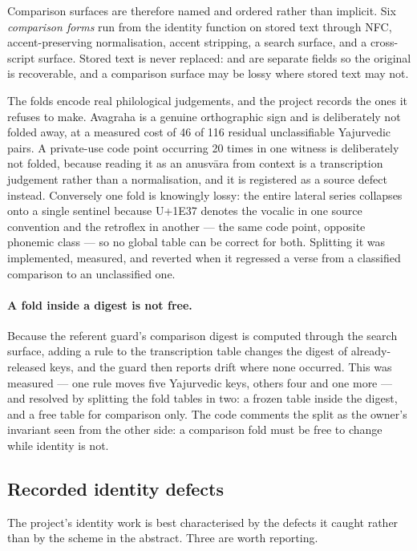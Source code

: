 Comparison surfaces are therefore named and ordered rather than implicit. Six
\emph{comparison forms} run from the identity function on stored text through
\mbox{NFC}, accent-preserving normalisation, accent stripping, a search surface, and a
cross-script surface. Stored text is never replaced:  and
 are separate fields so the original is recoverable, and a comparison
surface may be lossy where stored text may not.

The folds encode real philological judgements, and the project records the ones it
refuses to make. Avagraha is a genuine orthographic sign and is deliberately not
folded away, at a measured cost of 46 of 116 residual unclassifiable Yajurvedic pairs.
A private-use code point occurring 20 times in one witness is deliberately not folded,
because reading it as an anusv\=ara from context is a transcription judgement rather
than a normalisation, and it is registered as a source defect instead. Conversely one
fold is knowingly lossy: the entire lateral series collapses onto a single sentinel
because U+1E37 denotes the vocalic  in one source convention and the retroflex
 in another --- the same code point, opposite phonemic class --- so no
global table can be correct for both. Splitting it was implemented, measured, and
reverted when it regressed a verse from a classified comparison to an unclassified
one.

\paragraph{A fold inside a digest is not free.} Because the referent guard's
comparison digest is computed through the search surface, adding a rule to the
transcription table changes the digest of already-released keys, and the guard then
reports drift where none occurred. This was measured --- one rule moves five
Yajurvedic keys, others four and one more --- and resolved by splitting the fold
tables in two: a frozen table inside the digest, and a free table for comparison only.
The code comments the split as the owner's invariant seen from the other side: a
comparison fold must be free to change while identity is not.

\subsection{Recorded identity defects}

The project's identity work is best characterised by the defects it caught rather than
by the scheme in the abstract. Three are worth reporting.

